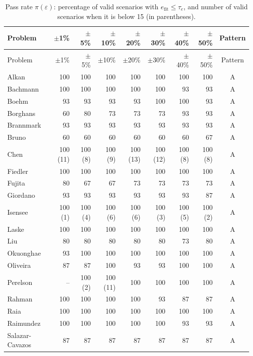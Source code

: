 {\small
\begin{longtable}{@{}lrrrrrrrc@{}}
\caption{Pass rate $\pi(\varepsilon)$: percentage of valid scenarios with $e_{\mathrm{fit}}\le\tau_e$, and number of valid scenarios when it is below 15 (in parentheses).}\label{tab:passrate}\\
\toprule Problem & $\pm$1\% & $\pm$5\% & $\pm$10\% & $\pm$20\% & $\pm$30\% & $\pm$40\% & $\pm$50\% & Pattern \\ \midrule \endfirsthead \toprule Problem & $\pm$1\% & $\pm$5\% & $\pm$10\% & $\pm$20\% & $\pm$30\% & $\pm$40\% & $\pm$50\% & Pattern \\ \midrule \endhead
Alkan & 100 & 100 & 100 & 100 & 100 & 100 & 100 & A \\
Bachmann & 100 & 100 & 100 & 100 & 100 & 93 & 93 & A \\
Boehm & 93 & 93 & 93 & 93 & 100 & 100 & 93 & A \\
Borghans & 60 & 80 & 73 & 73 & 73 & 93 & 93 & A \\
Brannmark & 93 & 93 & 93 & 93 & 93 & 93 & 93 & A \\
Bruno & 60 & 60 & 60 & 60 & 60 & 60 & 67 & A \\
Chen & 100 (11) & 100 (8) & 100 (9) & 100 (13) & 100 (12) & 100 (8) & 100 (8) & A \\
Fiedler & 100 & 100 & 100 & 100 & 100 & 100 & 100 & A \\
Fujita & 80 & 67 & 67 & 73 & 73 & 73 & 73 & A \\
Giordano & 93 & 93 & 93 & 93 & 93 & 93 & 87 & A \\
Isensee & 100 (1) & 100 (4) & 100 (6) & 100 (6) & 100 (3) & 100 (5) & 100 (2) & A \\
Laske & 100 & 100 & 100 & 100 & 100 & 100 & 100 & A \\
Liu & 80 & 80 & 80 & 80 & 80 & 73 & 80 & A \\
Okuonghae & 93 & 100 & 100 & 100 & 100 & 100 & 100 & A \\
Oliveira & 87 & 87 & 100 & 93 & 93 & 100 & 100 & A \\
Perelson & -- & 100 (2) & 100 (11) & 100 & 100 & 100 & 100 & A \\
Rahman & 100 & 100 & 100 & 100 & 93 & 87 & 87 & A \\
Raia & 100 & 100 & 100 & 100 & 100 & 100 & 100 & A \\
Raimundez & 100 & 100 & 100 & 100 & 100 & 93 & 93 & A \\
Salazar-Cavazos & 87 & 87 & 87 & 87 & 87 & 87 & 87 & A \\

\end{longtable}}
